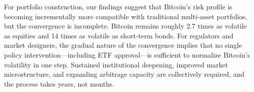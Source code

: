 \documentclass[12pt,a4paper]{article}
\begin{document}
For portfolio construction, our findings suggest that Bitcoin's risk profile
is becoming incrementally more compatible with traditional multi-asset
portfolios, but the convergence is incomplete. Bitcoin remains roughly 2.7
times as volatile as equities and 14 times as volatile as short-term
bonds. For regulators and market designers, the gradual nature of the
convergence implies that no single policy intervention---including ETF
approval---is sufficient to normalize Bitcoin's volatility in one step.
Sustained institutional deepening, improved market microstructure, and
expanding arbitrage capacity are collectively required, and the process
takes years, not months.

\FloatBarrier



\end{document}
